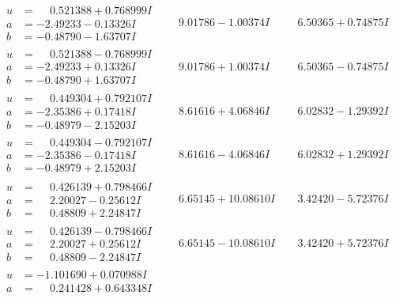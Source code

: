 \documentclass[1p]{elsarticle_modified}
\theoremstyle{definition}
\begin{document}
$$\begin{array}{c|c|c}
\begin{aligned}
u &= \phantom{-}0.521388 + 0.768999 I \\
a &= -2.49233 - 0.13326 I \\
b &= -0.48790 - 1.63707 I\end{aligned}
 & \phantom{-}9.01786 - 1.00374 I & \phantom{-}6.50365 + 0.74875 I \\ \hline\begin{aligned}
u &= \phantom{-}0.521388 - 0.768999 I \\
a &= -2.49233 + 0.13326 I \\
b &= -0.48790 + 1.63707 I\end{aligned}
 & \phantom{-}9.01786 + 1.00374 I & \phantom{-}6.50365 - 0.74875 I \\ \hline\begin{aligned}
u &= \phantom{-}0.449304 + 0.792107 I \\
a &= -2.35386 + 0.17418 I \\
b &= -0.48979 - 2.15203 I\end{aligned}
 & \phantom{-}8.61616 + 4.06846 I & \phantom{-}6.02832 - 1.29392 I \\ \hline\begin{aligned}
u &= \phantom{-}0.449304 - 0.792107 I \\
a &= -2.35386 - 0.17418 I \\
b &= -0.48979 + 2.15203 I\end{aligned}
 & \phantom{-}8.61616 - 4.06846 I & \phantom{-}6.02832 + 1.29392 I \\ \hline\begin{aligned}
u &= \phantom{-}0.426139 + 0.798466 I \\
a &= \phantom{-}2.20027 - 0.25612 I \\
b &= \phantom{-}0.48809 + 2.24847 I\end{aligned}
 & \phantom{-}6.65145 + 10.08610 I & \phantom{-}3.42420 - 5.72376 I \\ \hline\begin{aligned}
u &= \phantom{-}0.426139 - 0.798466 I \\
a &= \phantom{-}2.20027 + 0.25612 I \\
b &= \phantom{-}0.48809 - 2.24847 I\end{aligned}
 & \phantom{-}6.65145 - 10.08610 I & \phantom{-}3.42420 + 5.72376 I \\ \hline\begin{aligned}
u &= -1.101690 + 0.070988 I \\
a &= \phantom{-}0.241428 + 0.643348 I \\

\end{aligned}
\end{array}$$
\end{document}
